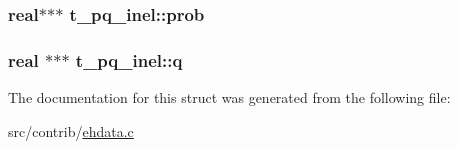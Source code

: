 \hypertarget{structt__pq__inel_a7f9d3dfd5e8fc9a0dd0592a59b15b3f5}{
\subsubsection[{prob}]{\setlength{\rightskip}{0pt plus 5cm}real$\ast$$\ast$$\ast$ {\bf t\-\_\-pq\-\_\-inel\-::prob}}}\label{structt__pq__inel_a7f9d3dfd5e8fc9a0dd0592a59b15b3f5}
\hypertarget{structt__pq__inel_a5e83ee8a160437288d221cf72ecfa905}{
\subsubsection[{q}]{\setlength{\rightskip}{0pt plus 5cm}real $\ast$$\ast$$\ast$ {\bf t\-\_\-pq\-\_\-inel\-::q}}}\label{structt__pq__inel_a5e83ee8a160437288d221cf72ecfa905}


\-The documentation for this struct was generated from the following file\-:\begin{DoxyCompactItemize}
\item 
src/contrib/\hyperlink{ehdata_8c}{ehdata.\-c}\end{DoxyCompactItemize}
